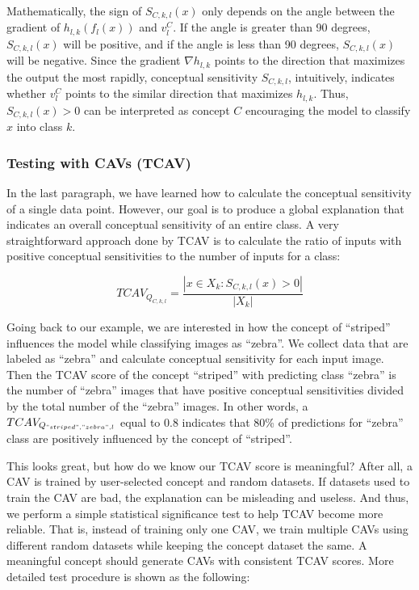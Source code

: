 \documentclass[12pt,]{krantz}
\begin{document}
Mathematically, the sign of \(S_{C,k,l}(x)\) only depends on the angle
between the gradient of \(h_{l,k}(f_l(x))\) and \(v_l^C\). If the angle
is greater than 90 degrees, \(S_{C,k,l}(x)\) will be positive, and if
the angle is less than 90 degrees, \(S_{C,k,l}(x)\) will be negative.
Since the gradient \(\nabla h_{l,k}\) points to the direction that
maximizes the output the most rapidly, conceptual sensitivity
\(S_{C,k,l}\), intuitively, indicates whether \(v_l^C\) points to the
similar direction that maximizes \(h_{l,k}\). Thus, \(S_{C,k,l}(x)>0\)
can be interpreted as concept \(C\) encouraging the model to classify
\(x\) into class \(k\).

\subsubsection{Testing with CAVs (TCAV)}\label{testing-with-cavs-tcav}

In the last paragraph, we have learned how to calculate the conceptual
sensitivity of a single data point. However, our goal is to produce a
global explanation that indicates an overall conceptual sensitivity of
an entire class. A very straightforward approach done by TCAV is to
calculate the ratio of inputs with positive conceptual sensitivities to
the number of inputs for a class:

\[TCAV_{Q_{C,k,l}}=\frac{|{x\in X_k:S_{C,k,l}(x)>0}|}{|X_k|}\]

Going back to our example, we are interested in how the concept of
``striped'' influences the model while classifying images as ``zebra''.
We collect data that are labeled as ``zebra'' and calculate conceptual
sensitivity for each input image. Then the TCAV score of the concept
``striped'' with predicting class ``zebra'' is the number of ``zebra''
images that have positive conceptual sensitivities divided by the total
number of the ``zebra'' images. In other words, a
\(TCAV_{Q_{"striped","zebra",l}}\) equal to 0.8 indicates that 80\% of
predictions for ``zebra'' class are positively influenced by the concept
of ``striped''.

This looks great, but how do we know our TCAV score is meaningful? After
all, a CAV is trained by user-selected concept and random datasets. If
datasets used to train the CAV are bad, the explanation can be
misleading and useless. And thus, we perform a simple statistical
significance test to help TCAV become more reliable. That is, instead of
training only one CAV, we train multiple CAVs using different random
datasets while keeping the concept dataset the same. A meaningful
concept should generate CAVs with consistent TCAV scores. More detailed
test procedure is shown as the following:
\end{document}
